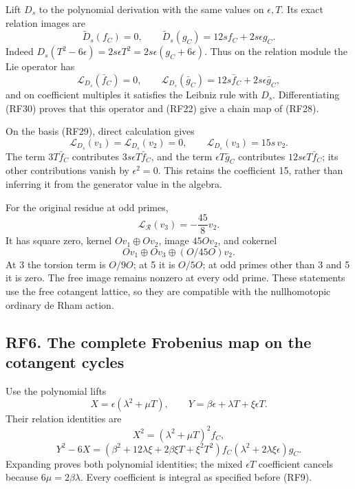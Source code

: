 \documentclass[
]{article}
\begin{document}
Lift \(D_s\) to the polynomial derivation with the same values on
\(\epsilon,T\). Its exact relation images are \[
\widetilde D_s(f_C)=0,\qquad
\widetilde D_s(g_C)=12s f_C+2s\epsilon g_C.
\tag{RF30}
\] Indeed
\(D_s(T^2-6\epsilon)=2s\epsilon T^2=2s\epsilon(g_C+6\epsilon)\). Thus on
the relation module the Lie operator has \[
\mathcal L_{D_s}(\bar f_C)=0,\qquad
\mathcal L_{D_s}(\bar g_C)=12s\bar f_C+2s\epsilon\bar g_C,
\] and on coefficient multiples it satisfies the Leibniz rule with
\(D_s\). Differentiating (RF30) proves that this operator and (RF22)
give a chain map of (RF28).

On the basis (RF29), direct calculation gives \[
\mathcal L_{D_s}(v_1)=\mathcal L_{D_s}(v_2)=0,\qquad
\mathcal L_{D_s}(v_3)=15s\,v_2.
\tag{RF31}
\] The term \(3T\bar f_C\) contributes \(3s\epsilon T\bar f_C\), and the
term \(\epsilon T\bar g_C\) contributes \(12s\epsilon T\bar f_C\); its
other contributions vanish by \(\epsilon^2=0\). This retains the
coefficient 15, rather than inferring it from the generator value in the
algebra.

For the original residue at odd primes, \[
\mathcal L_{\mathcal R}(v_3)=-\frac{45}{8}v_2.
\tag{RF32}
\] It has square zero, kernel \(Ov_1\oplus Ov_2\), image \(45Ov_2\), and
cokernel \[
Ov_1\oplus Ov_3\oplus(O/45O)v_2.
\tag{RF33}
\] At 3 the torsion term is \(O/9O\); at 5 it is \(O/5O\); at odd primes
other than 3 and 5 it is zero. The free image remains nonzero at every
odd prime. These statements use the free cotangent lattice, so they are
compatible with the nullhomotopic ordinary de Rham action.

\subsection{RF6. The complete Frobenius map on the cotangent
cycles}\label{rf6.-the-complete-frobenius-map-on-the-cotangent-cycles}

Use the polynomial lifts \[
X=\epsilon(\lambda^2+\mu T),\qquad
Y=\beta\epsilon+\lambda T+\xi\epsilon T.
\] Their relation identities are \[
X^2=(\lambda^2+\mu T)^2 f_C,
\] \[
Y^2-6X=
\left(\beta^2+12\lambda\xi+2\beta\xi T+\xi^2T^2\right)f_C
\left(\lambda^2+2\lambda\xi\epsilon\right)g_C.
\tag{RF34}
\] Expanding proves both polynomial identities; the mixed \(\epsilon T\)
coefficient cancels because \(6\mu=2\beta\lambda\). Every coefficient is
integral as specified before (RF9).
\end{document}
